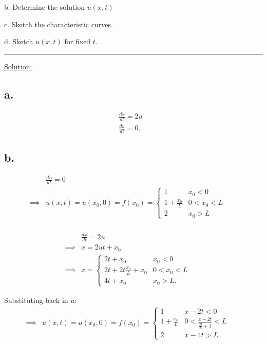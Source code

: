 \documentclass{article}
\begin{document}
b. Determine the solution $u(x,t)$

c. Sketch the characteristic curves.

d. Sketch $u(x,t)$ for fixed $t$.

\begin{center}
  \noindent\rule{8cm}{0.4pt}
\end{center}

\underline{Solution:}

\subsection*{a.}
\begin{align*}
    &\frac{dx}{dt} = 2u &&\\
    &\frac{du}{dt} = 0.
\end{align*}

\subsection*{b.}
\begin{align*}
  &\frac{du}{dt} = 0 &&\\
  \implies&u(x,t) = u(x_0,0) = f(x_0) = \begin{cases}
    1 & x_0 < 0 \\
    1 + \frac{x_0}{L} & 0 < x_0 < L \\
    2 & x_0 > L
  \end{cases} &&\\
\end{align*}

\begin{align*}
  &\frac{dx}{dt} = 2u &&\\
  \implies& x = 2ut + x_0 &&\\
  \implies& x = \begin{cases}
    2t + x_0 & x_0 < 0 \\
    2t + 2t \frac{x_0}{L} + x_0 & 0 < x_0 < L \\
    4t + x_0 & x_0 > L.
\end{cases}
\end{align*}

Substituting back in $u$:
\begin{align*}
  \implies&u(x,t) = u(x_0,0) = f(x_0) = \begin{cases}
    1 & x-2t < 0 \\
    1 + \frac{x_0}{L} & 0 < \frac{x - 2t}{\frac{2t}{L} + 1} < L \\
    2 & x-4t > L
  \end{cases} &&\\
\end{align*}
\end{document}
